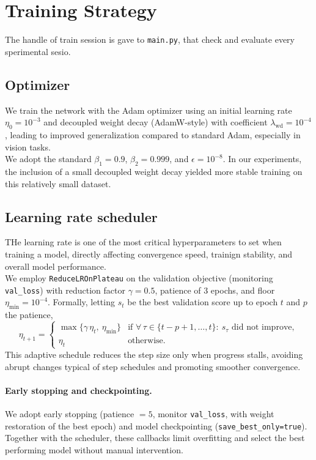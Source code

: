 \documentclass[target=bach,aauheader=,style=]{thud}
\begin{document}
\section{Training Strategy}
The handle of train session is gave to \texttt{main.py}, that check and evaluate every sperimental sesio. 
\label{sec:train-strategy}

\subsection{Optimizer}
We train the network with the Adam optimizer \cite{kingma2014adam} using an initial learning rate $\eta_0=10^{-3}$ and
decoupled weight decay (AdamW-style) with coefficient $\lambda_{\mathrm{wd}}=10^{-4}$ \cite{loshchilov2019adamw}, leading to improved generalization compared to standard Adam, especially in vision tasks.\\
We adopt the standard $\beta_1{=}0.9$, $\beta_2{=}0.999$, and $\epsilon{=}10^{-8}$. In our experiments, the inclusion of a small decoupled weight decay yielded more stable training on this relatively small dataset.

\subsection{Learning rate scheduler}
THe learning rate is one of the most critical hyperparameters to set when training a model, directly affecting convergence speed, trainign stability, and overall model performance.\\
We employ \texttt{ReduceLROnPlateau} on the validation objective (monitoring \texttt{val\_loss}) with
reduction factor $\gamma{=}0.5$, patience of 3 epochs, and floor $\eta_{\min}{=}10^{-4}$.
Formally, letting $s_t$ be the best validation score up to epoch $t$ and $p$ the patience,
\[
\eta_{t+1} =
\begin{cases}
\max\{\gamma\,\eta_t,\ \eta_{\min}\} &\text{if } \forall\,\tau\in\{t-p+1,\ldots,t\}:\ s_\tau \text{ did not improve},\\[2pt]
\eta_t &\text{otherwise.}
\end{cases}
\]
This adaptive schedule reduces the step size only when progress stalls, avoiding abrupt changes typical of step schedules and promoting smoother convergence.

\paragraph{Early stopping and checkpointing.}
We adopt early stopping (patience $=5$, monitor \texttt{val\_loss}, with weight restoration of the best epoch) and model checkpointing (\texttt{save\_best\_only=true}). Together with the scheduler, these callbacks limit overfitting and select the best performing model without manual intervention.
\end{document}
